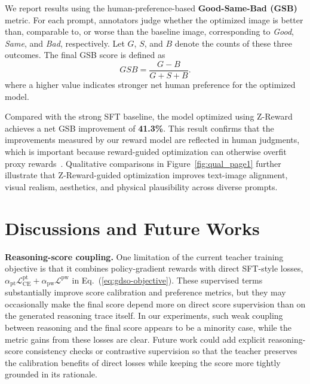 \documentclass{article}
\newcommand{\mname}{Z-Reward\xspace}
\begin{document}
We report results using the human-preference-based \textbf{Good-Same-Bad (GSB)} metric. For each prompt, annotators judge whether the optimized image is better than, comparable to, or worse than the baseline image, corresponding to \textit{Good}, \textit{Same}, and \textit{Bad}, respectively. Let $G$, $S$, and $B$ denote the counts of these three outcomes. The final GSB score is defined as
\begin{equation}
    GSB = \frac{G - B}{G + S + B}.
    \label{eq:gsb}
\end{equation}
where a higher value indicates stronger net human preference for the optimized model.

Compared with the strong SFT baseline, the model optimized using \mname achieves a net GSB improvement of \textbf{41.3\%}. This result confirms that the improvements measured by our reward model are reflected in human judgments, which is important because reward-guided optimization can otherwise overfit proxy rewards~\cite{gao2023scaling,rafailov2024scaling}. Qualitative comparisons in Figure~\ref{fig:qual_page1} further illustrate that \mname-guided optimization improves text-image alignment, visual realism, aesthetics, and physical plausibility across diverse prompts.







\section{Discussions and Future Works}

\textbf{Reasoning-score coupling.}
One limitation of the current teacher training objective is that it combines policy-gradient rewards with direct SFT-style losses, $\alpha_{\mathrm{pt}}\mathcal{L}^{\mathrm{pt}}_{\mathrm{CE}}+\alpha_{\mathrm{pw}}\mathcal{L}^{\mathrm{pw}}$ in Eq.~(\ref{eq:gdso-objective}). These supervised terms substantially improve score calibration and preference metrics, but they may occasionally make the final score depend more on direct score supervision than on the generated reasoning trace itself. In our experiments, such weak coupling between reasoning and the final score appears to be a minority case, while the metric gains from these losses are clear. Future work could add explicit reasoning-score consistency checks or contrastive supervision so that the teacher preserves the calibration benefits of direct losses while keeping the score more tightly grounded in its rationale.
\end{document}
